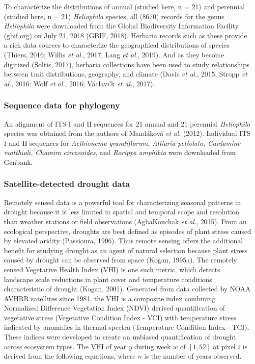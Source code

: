 \documentclass[man,floatsintext]{apa6}
\theoremstyle{definition}
\theoremstyle{definition}
\theoremstyle{definition}
\theoremstyle{remark}
\begin{document}
To characterize the distributions of annual (studied here, n = 21) and
perennial (studied here, n = 21) \emph{Heliophila} species, all (8670)
records for the genus \emph{Heliophila} were downloaded from the Global
Biodiversity Information Facility (gbif.org) on July 21, 2018 (GBIF,
2018). Herbaria records such as these provide a rich data sources to
characterize the geographical distributions of species (Thiers, 2016;
Willis \emph{et al.}, 2017; Lang \emph{et al.}, 2019). And as they
become digitized (Soltis, 2017), herbaria collections have been used to
study relationships between trait distributions, geography, and climate
(Davis \emph{et al.}, 2015; Stropp \emph{et al.}, 2016; Wolf \emph{et
al.}, 2016; Václavı'k \emph{et al.}, 2017).

\hypertarget{sequence-data-for-phylogeny}{%
\subsubsection{Sequence data for
phylogeny}\label{sequence-data-for-phylogeny}}

An alignment of ITS I and II sequences for 21 annual and 21 perennial
\emph{Heliophila} species was obtained from the authors of Mandáková
\emph{et al.} (2012). Individual ITS I and II sequences for
\emph{Aethionema grandiflorum, Alliaria petiolata, Cardamine matthioli,
Chamira circaeoides}, and \emph{Rorippa amphibia} were downloaded from
Genbank.

\hypertarget{satellite-detected-drought-data}{%
\subsubsection{Satellite-detected drought
data}\label{satellite-detected-drought-data}}

Remotely sensed data is a powerful tool for characterizing seasonal
patterns in drought because it is less limited in spatial and temporal
scope and resolution than weather stations or field observations
(AghaKouchak \emph{et al.}, 2015). From an ecological perspective,
droughts are best defined as episodes of plant stress caused by elevated
aridity (Passioura, 1996). Thus remote sensing offers the additional
benefit for studying drought as an agent of natural selection because
plant stress caused by drought can be observed from space (Kogan,
1995a). The remotely sensed Vegetative Health Index (VHI) is one such
metric, which detects landscape scale reductions in plant cover and
temperature conditions characteristic of drought (Kogan, 2001).
Generated from data collected by NOAA AVHRR satellites since 1981, the
VHI is a composite index combining Normalized Difference Vegetation
Index (NDVI) derived quantification of vegetative stress (Vegetative
Condition Index - VCI) with temperature stress indicated by anomalies in
thermal spectra (Temperature Condition Index - TCI). These indices were
developed to create an unbiased quantification of drought across
ecosystem types. The VHI of year \(y\) during week \(w\) of \([1,52]\)
at pixel \(i\) is derived from the following equations, where \(n\) is
the number of years observed.
\end{document}

